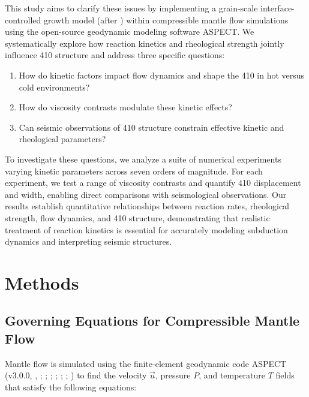 \documentclass[
  paper=a4,
  ,captions=tableheading
]{scrartcl}
\providecommand{\tightlist}{%
  \setlength{\itemsep}{0pt}\setlength{\parskip}{0pt}}
\begin{document}
This study aims to clarify these issues by implementing a grain-scale
interface-controlled growth model (after
) within compressible
mantle flow simulations using the open-source geodynamic modeling
software ASPECT. We systematically explore how reaction kinetics and
rheological strength jointly influence 410 structure and address three
specific questions:

\begin{enumerate}
\def\labelenumi{\arabic{enumi}.}
\tightlist
\item
  How do kinetic factors impact flow dynamics and shape the 410 in hot
  versus cold environments?
\item
  How do viscosity contrasts modulate these kinetic effects?
\item
  Can seismic observations of 410 structure constrain effective kinetic
  and rheological parameters?
\end{enumerate}

To investigate these questions, we analyze a suite of numerical
experiments varying kinetic parameters across seven orders of magnitude.
For each experiment, we test a range of viscosity contrasts and quantify
410 displacement and width, enabling direct comparisons with
seismological observations. Our results establish quantitative
relationships between reaction rates, rheological strength, flow
dynamics, and 410 structure, demonstrating that realistic treatment of
reaction kinetics is essential for accurately modeling subduction
dynamics and interpreting seismic structures.

\section{Methods}\label{sec:methods}

\subsection{Governing Equations for Compressible Mantle
Flow}\label{sec:governing-equations}

Mantle flow is simulated using the finite-element geodynamic code ASPECT
(v3.0.0, ,
;
;
;
;
;
;
) to find the
velocity \(\vec{u}\), pressure \(P\), and temperature \(T\) fields that
satisfy the following equations:
\end{document}
